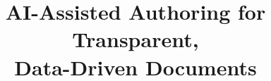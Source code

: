 \documentclass{article}
\begin{document}
\title{AI-Assisted Authoring for Transparent, \\Data-Driven Documents}

\maketitle








\end{document}
